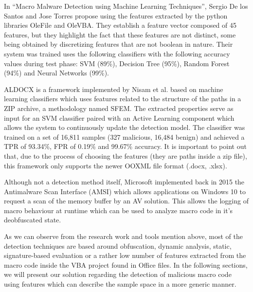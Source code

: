In “Macro Malware Detection using Machine Learning Techniques”, Sergio De los Santos and Jose Torres propose using the features extracted by the python libraries OleFile and OleVBA. They establish a feature vector composed of 45 features, but they highlight the fact that these features are not distinct, some being obtained by discretizing features that are not boolean in nature. Their system was trained  uses the following classifiers with the following accuracy values during test phase: SVM (89\%),  Decision Tree (95\%), Random Forest (94\%) and Neural Networks (99\%). 
\par
ALDOCX is a framework implemented by Nisam et al. based on machine learning classifiers which uses features related to the structure of the paths in a ZIP archive, a methodology named SFEM. The extracted properties serve as input for an SVM classifier paired with an Active Learning component which allows the system to continuously update the detection model. The classifier was trained on a set of 16,811 samples (327 malicious, 16,484 benign) and achieved a TPR of 93.34\%, FPR of 0.19\% and 99.67\% accuracy. It is important to point out that, due to the process of choosing the features (they are paths inside a zip file), this framework only supports the newer OOXML file format (.docx, .xlsx).
\par
Although not a detection method itself, Microsoft implemented back in 2015 the Antimalware Scan Interface (AMSI) which allows applications on Windows 10 to request a scan of the memory buffer by an AV solution. This allows the logging of macro behaviour at runtime which can be used to analyze macro code in it’s deobfuscated state.
\par
As we can observe from the research work and tools mention above, most of the detection techniques are based around obfuscation, dynamic analysis, static, signature-based evaluation or a rather low number of features extracted from the macro code inside the VBA project found in Office files.
In the following sections, we will present our solution regarding the detection of malicious macro code using features which can describe the sample space in a more generic manner.